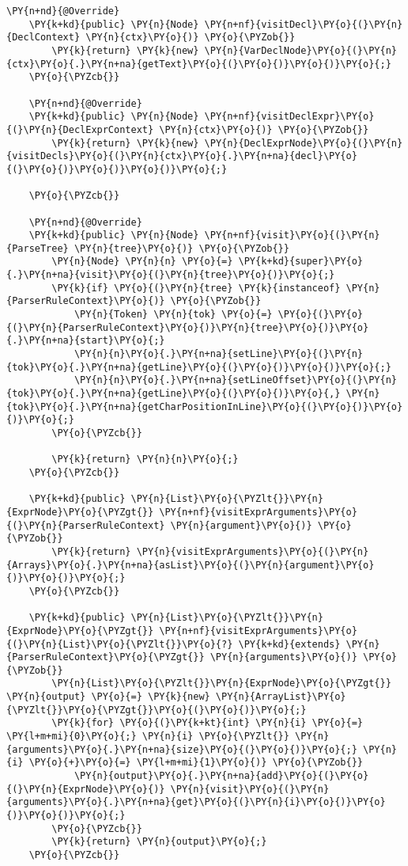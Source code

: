 \begin{Verbatim}[commandchars=\\\{\}]
    \PY{n+nd}{@Override}
    \PY{k+kd}{public} \PY{n}{Node} \PY{n+nf}{visitDecl}\PY{o}{(}\PY{n}{DeclContext} \PY{n}{ctx}\PY{o}{)} \PY{o}{\PYZob{}}
        \PY{k}{return} \PY{k}{new} \PY{n}{VarDeclNode}\PY{o}{(}\PY{n}{ctx}\PY{o}{.}\PY{n+na}{getText}\PY{o}{(}\PY{o}{)}\PY{o}{)}\PY{o}{;}
    \PY{o}{\PYZcb{}}
    
    \PY{n+nd}{@Override}
    \PY{k+kd}{public} \PY{n}{Node} \PY{n+nf}{visitDeclExpr}\PY{o}{(}\PY{n}{DeclExprContext} \PY{n}{ctx}\PY{o}{)} \PY{o}{\PYZob{}}
        \PY{k}{return} \PY{k}{new} \PY{n}{DeclExprNode}\PY{o}{(}\PY{n}{visitDecls}\PY{o}{(}\PY{n}{ctx}\PY{o}{.}\PY{n+na}{decl}\PY{o}{(}\PY{o}{)}\PY{o}{)}\PY{o}{)}\PY{o}{;}
        
    \PY{o}{\PYZcb{}}

    \PY{n+nd}{@Override}
    \PY{k+kd}{public} \PY{n}{Node} \PY{n+nf}{visit}\PY{o}{(}\PY{n}{ParseTree} \PY{n}{tree}\PY{o}{)} \PY{o}{\PYZob{}}
        \PY{n}{Node} \PY{n}{n} \PY{o}{=} \PY{k+kd}{super}\PY{o}{.}\PY{n+na}{visit}\PY{o}{(}\PY{n}{tree}\PY{o}{)}\PY{o}{;}
        \PY{k}{if} \PY{o}{(}\PY{n}{tree} \PY{k}{instanceof} \PY{n}{ParserRuleContext}\PY{o}{)} \PY{o}{\PYZob{}}
            \PY{n}{Token} \PY{n}{tok} \PY{o}{=} \PY{o}{(}\PY{o}{(}\PY{n}{ParserRuleContext}\PY{o}{)}\PY{n}{tree}\PY{o}{)}\PY{o}{.}\PY{n+na}{start}\PY{o}{;}
            \PY{n}{n}\PY{o}{.}\PY{n+na}{setLine}\PY{o}{(}\PY{n}{tok}\PY{o}{.}\PY{n+na}{getLine}\PY{o}{(}\PY{o}{)}\PY{o}{)}\PY{o}{;}
            \PY{n}{n}\PY{o}{.}\PY{n+na}{setLineOffset}\PY{o}{(}\PY{n}{tok}\PY{o}{.}\PY{n+na}{getLine}\PY{o}{(}\PY{o}{)}\PY{o}{,} \PY{n}{tok}\PY{o}{.}\PY{n+na}{getCharPositionInLine}\PY{o}{(}\PY{o}{)}\PY{o}{)}\PY{o}{;}
        \PY{o}{\PYZcb{}}

        \PY{k}{return} \PY{n}{n}\PY{o}{;}
    \PY{o}{\PYZcb{}}

    \PY{k+kd}{public} \PY{n}{List}\PY{o}{\PYZlt{}}\PY{n}{ExprNode}\PY{o}{\PYZgt{}} \PY{n+nf}{visitExprArguments}\PY{o}{(}\PY{n}{ParserRuleContext} \PY{n}{argument}\PY{o}{)} \PY{o}{\PYZob{}}
        \PY{k}{return} \PY{n}{visitExprArguments}\PY{o}{(}\PY{n}{Arrays}\PY{o}{.}\PY{n+na}{asList}\PY{o}{(}\PY{n}{argument}\PY{o}{)}\PY{o}{)}\PY{o}{;}
    \PY{o}{\PYZcb{}}

    \PY{k+kd}{public} \PY{n}{List}\PY{o}{\PYZlt{}}\PY{n}{ExprNode}\PY{o}{\PYZgt{}} \PY{n+nf}{visitExprArguments}\PY{o}{(}\PY{n}{List}\PY{o}{\PYZlt{}}\PY{o}{?} \PY{k+kd}{extends} \PY{n}{ParserRuleContext}\PY{o}{\PYZgt{}} \PY{n}{arguments}\PY{o}{)} \PY{o}{\PYZob{}}
        \PY{n}{List}\PY{o}{\PYZlt{}}\PY{n}{ExprNode}\PY{o}{\PYZgt{}} \PY{n}{output} \PY{o}{=} \PY{k}{new} \PY{n}{ArrayList}\PY{o}{\PYZlt{}}\PY{o}{\PYZgt{}}\PY{o}{(}\PY{o}{)}\PY{o}{;}
        \PY{k}{for} \PY{o}{(}\PY{k+kt}{int} \PY{n}{i} \PY{o}{=} \PY{l+m+mi}{0}\PY{o}{;} \PY{n}{i} \PY{o}{\PYZlt{}} \PY{n}{arguments}\PY{o}{.}\PY{n+na}{size}\PY{o}{(}\PY{o}{)}\PY{o}{;} \PY{n}{i} \PY{o}{+}\PY{o}{=} \PY{l+m+mi}{1}\PY{o}{)} \PY{o}{\PYZob{}}
            \PY{n}{output}\PY{o}{.}\PY{n+na}{add}\PY{o}{(}\PY{o}{(}\PY{n}{ExprNode}\PY{o}{)} \PY{n}{visit}\PY{o}{(}\PY{n}{arguments}\PY{o}{.}\PY{n+na}{get}\PY{o}{(}\PY{n}{i}\PY{o}{)}\PY{o}{)}\PY{o}{)}\PY{o}{;}
        \PY{o}{\PYZcb{}}
        \PY{k}{return} \PY{n}{output}\PY{o}{;}
    \PY{o}{\PYZcb{}}
    

\end{Verbatim}
